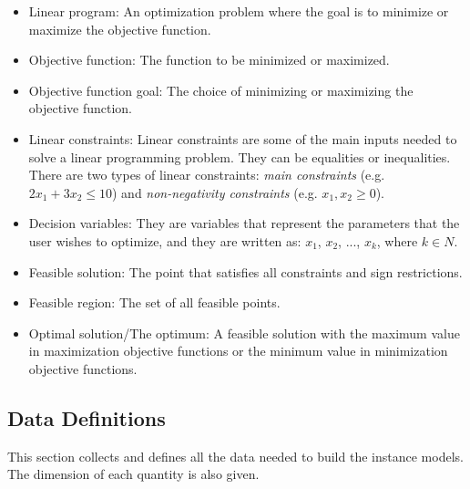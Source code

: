 \documentclass[12pt]{article}
\begin{document}
\begin{itemize}
	\item Linear program: An optimization problem where the goal is to minimize 
	or maximize the objective function.
	
	\item Objective function: The function to be minimized or maximized.
	
	\item Objective function goal: The choice of minimizing or maximizing the 
	objective function.
	
	\item Linear constraints: Linear constraints are some of the main inputs 
	needed to solve a linear programming problem. They can be equalities or 
	inequalities. There are two types of linear constraints: \textit{main 
	constraints} (e.g. $2x_1 + 3x_2 \leq 10$) and \textit{non-negativity 
	constraints} (e.g. $x_1, x_2 \geq 0$).
	
	\item Decision variables: They are variables that represent the parameters 
	that the user wishes to optimize, and they are written as: ${x_1}$, 
	${x_2}$, ..., ${x_k}$, where $k \in N$.
	
	\item Feasible solution: The point that satisfies all constraints and sign 
	restrictions.
	
	\item Feasible region: The set of all feasible points.
	
	\item Optimal solution/The optimum: A feasible solution with the maximum 
	value in maximization objective functions or the minimum value in 
	minimization objective functions.
\end{itemize}

\subsection{Data Definitions} \label{sec_datadef}

This section collects and defines all the data needed to build the instance
models. The dimension of each quantity is also given.  
	
~\newline
\end{document}
